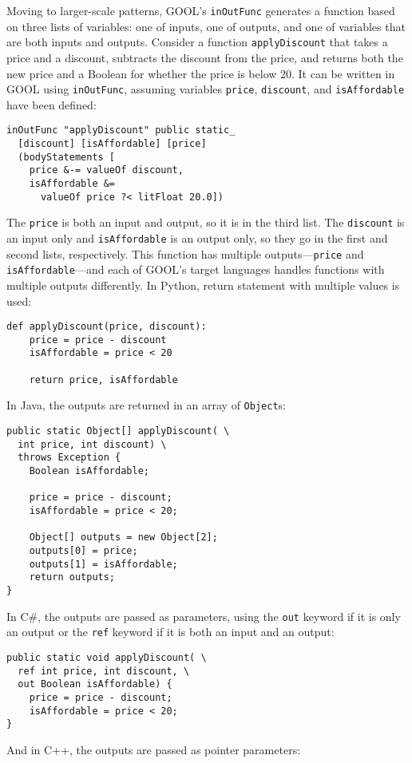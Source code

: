 \documentclass[sigplan,review,anonymous]{acmart}
\begin{document}
Moving to larger-scale patterns, GOOL's \verb|inOutFunc| generates a function  
based on three lists of variables: one of inputs, one of outputs, and one of 
variables that are both inputs and outputs. Consider a function 
\verb|applyDiscount| that takes a price and a discount, subtracts the discount 
from the price, and returns both the new price and a Boolean for whether the 
price is below 20. It can be written in GOOL using \verb|inOutFunc|, assuming 
variables \verb|price|, \verb|discount|, and \verb|isAffordable| have been 
defined:
\begin{lstlisting}
inOutFunc "applyDiscount" public static_
  [discount] [isAffordable] [price]
  (bodyStatements [
    price &-= valueOf discount,
    isAffordable &= 
      valueOf price ?< litFloat 20.0])
\end{lstlisting}
The \verb|price| is both an input and output, so it is in the third list. The 
\verb|discount| is an input only and \verb|isAffordable| is an output only, so 
they go in the first and second lists, respectively. This function has multiple 
outputs---\verb|price| and \verb|isAffordable|---and each of GOOL's target 
languages handles functions with multiple outputs differently. In Python, 
return statement with multiple values is used:
\begin{lstlisting}
def applyDiscount(price, discount):
    price = price - discount
    isAffordable = price < 20

    return price, isAffordable
\end{lstlisting}
In Java, the outputs are returned in an array of \verb|Object|s:
\begin{lstlisting}
public static Object[] applyDiscount( \
  int price, int discount) \
  throws Exception {
    Boolean isAffordable;

    price = price - discount;
    isAffordable = price < 20;

    Object[] outputs = new Object[2];
    outputs[0] = price;
    outputs[1] = isAffordable;
    return outputs;
}
\end{lstlisting}
In C\#, the outputs are passed as parameters, using the \verb|out| keyword if
it is only an output or the \verb|ref| keyword if it is both an input and an
output:
\begin{lstlisting}
public static void applyDiscount( \
  ref int price, int discount, \
  out Boolean isAffordable) {
    price = price - discount;
    isAffordable = price < 20;
}
\end{lstlisting}
And in C++, the outputs are passed as pointer parameters:
\end{document}
